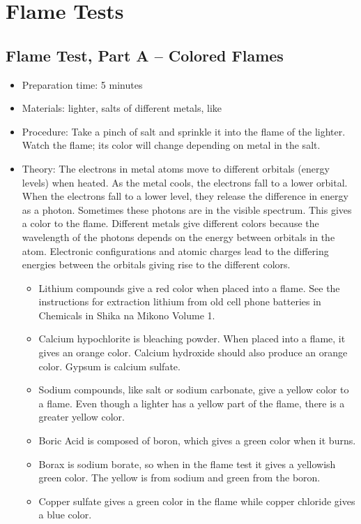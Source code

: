 \section{Flame Tests}

\subsection{Flame Test, Part A -- Colored Flames}
\begin{itemize}
\item{Preparation time: 5 minutes}
\item{Materials: lighter, salts of different metals, like }
\item{Procedure: Take a pinch of salt and sprinkle it into the flame of the lighter. Watch the flame; its color will change depending on metal in the salt.}
\item{Theory: The electrons in metal atoms move to different orbitals (energy levels) when heated. As the metal cools, the electrons fall to a lower orbital. When the electrons fall to a lower level, they release the difference in energy as a photon. Sometimes these photons are in the visible spectrum. This gives a color to the flame. Different metals give different colors because the wavelength of the photons depends on the energy between orbitals in the atom. Electronic configurations and atomic charges lead to the differing energies between the orbitals giving rise to the different colors.}
\begin{itemize}
\item{Lithium compounds give a red color when placed into a flame. See the instructions for extraction lithium from old cell phone batteries in Chemicals in Shika na Mikono Volume 1.}
\item{Calcium hypochlorite is bleaching powder. When placed into a flame, it gives an orange color. Calcium hydroxide should also produce an orange color. Gypsum is calcium sulfate.}
\item{Sodium compounds, like salt or sodium carbonate, give a yellow color to a flame. Even though a lighter has a yellow part of the flame, there is a greater yellow color.}
\item{Boric Acid is composed of boron, which gives a green color when it burns.}
\item{Borax is sodium borate, so when in the flame test it gives a yellowish green color. The yellow is from sodium and green from the boron.}
\item{Copper sulfate gives a green color in the flame while copper chloride gives a blue color.}

\end{itemize}
\end{itemize}
